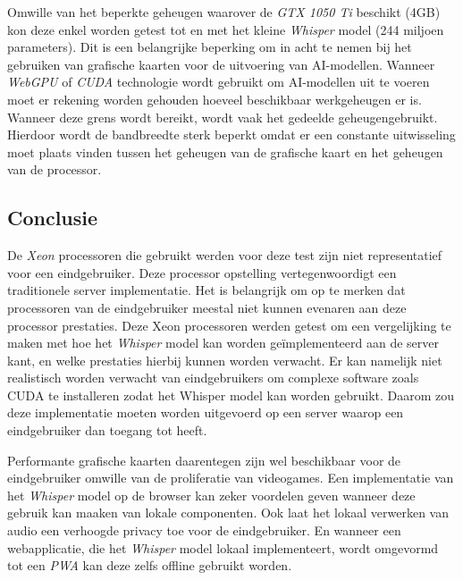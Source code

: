 \bigbreak{}

Omwille van het beperkte geheugen waarover de \textit{GTX 1050 Ti} beschikt (4GB) kon deze enkel worden getest tot en met het kleine \textit{Whisper} model (244 miljoen parameters). Dit is een belangrijke beperking om in acht te nemen bij het gebruiken van grafische kaarten voor de uitvoering van AI-modellen. Wanneer \textit{WebGPU} of \textit{CUDA} technologie wordt gebruikt om AI-modellen uit te voeren moet er rekening worden gehouden hoeveel beschikbaar werkgeheugen er is. Wanneer deze grens wordt bereikt, wordt vaak het gedeelde geheugengebruikt. Hierdoor wordt de bandbreedte sterk beperkt omdat er een constante uitwisseling moet plaats vinden tussen het geheugen van de grafische kaart en het geheugen van de processor.

\subsection{Conclusie}

De \textit{Xeon} processoren die gebruikt werden voor deze test zijn niet representatief voor een eindgebruiker. Deze processor opstelling vertegenwoordigt een traditionele server implementatie. Het is belangrijk om op te merken dat processoren van de eindgebruiker meestal niet kunnen evenaren aan deze processor prestaties. Deze Xeon processoren werden getest om een vergelijking te maken met hoe het \textit{Whisper} model kan worden geïmplementeerd aan de server kant, en welke prestaties hierbij kunnen worden verwacht. Er kan namelijk niet realistisch worden verwacht van eindgebruikers om complexe software zoals CUDA te installeren zodat het Whisper model kan worden gebruikt. Daarom zou deze implementatie moeten worden uitgevoerd op een server waarop een eindgebruiker dan toegang tot heeft.

\bigbreak{}

Performante grafische kaarten daarentegen zijn wel beschikbaar voor de eindgebruiker omwille van de proliferatie van videogames. Een implementatie van het \textit{Whisper} model op de browser kan zeker voordelen geven wanneer deze gebruik kan maaken van lokale componenten. Ook laat het lokaal verwerken van audio een verhoogde privacy toe voor de eindgebruiker. En wanneer een webapplicatie, die het \textit{Whisper} model lokaal implementeert, wordt omgevormd tot een \textit{PWA} kan deze zelfs offline gebruikt worden.

